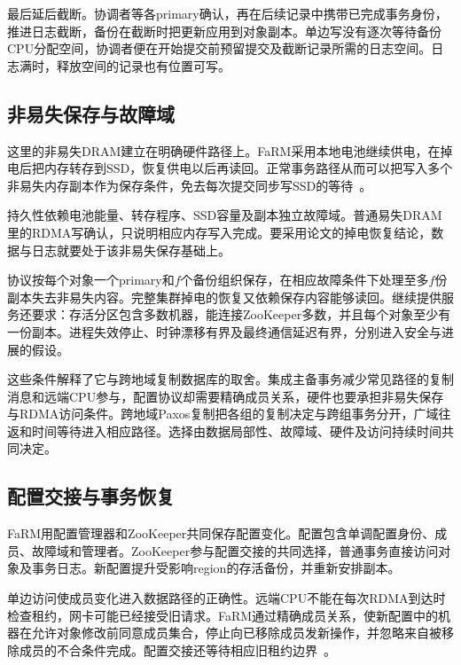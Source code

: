 最后延后截断。协调者等各primary确认，再在后续记录中携带已完成事务身份，推进日志截断，备份在截断时把更新应用到对象副本。单边写没有逐次等待备份CPU分配空间，协调者便在开始提交前预留提交及截断记录所需的日志空间。日志满时，释放空间的记录也有位置可写。

\subsection{非易失保存与故障域}

这里的非易失DRAM建立在明确硬件路径上。FaRM采用本地电池继续供电，在掉电后把内存转存到SSD，恢复供电以后再读回。正常事务路径从而可以把写入多个非易失内存副本作为保存条件，免去每次提交同步写SSD的等待~\cite{farm2015}。


持久性依赖电池能量、转存程序、SSD容量及副本独立故障域。普通易失DRAM里的RDMA写确认，只说明相应内存写入完成。要采用论文的掉电恢复结论，数据与日志就要处于该非易失保存基础上。

协议按每个对象一个primary和$f$个备份组织保存，在相应故障条件下处理至多$f$份副本失去非易失内容。完整集群掉电的恢复又依赖保存内容能够读回。继续提供服务还要求：存活分区包含多数机器，能连接ZooKeeper多数，并且每个对象至少有一份副本。进程失效停止、时钟漂移有界及最终通信延迟有界，分别进入安全与进展的假设。

这些条件解释了它与跨地域复制数据库的取舍。集成主备事务减少常见路径的复制消息和远端CPU参与，配置协议却需要精确成员关系，硬件也要承担非易失保存与RDMA访问条件。跨地域Paxos复制把各组的复制决定与跨组事务分开，广域往返和时间等待进入相应路径。选择由数据局部性、故障域、硬件及访问持续时间共同决定。

\subsection{配置交接与事务恢复}

FaRM用配置管理器和ZooKeeper共同保存配置变化。配置包含单调配置身份、成员、故障域和管理者。ZooKeeper参与配置交接的共同选择，普通事务直接访问对象及事务日志。新配置提升受影响region的存活备份，并重新安排副本。

单边访问使成员变化进入数据路径的正确性。远端CPU不能在每次RDMA到达时检查租约，网卡可能已经接受旧请求。FaRM通过精确成员关系，使新配置中的机器在允许对象修改前同意成员集合，停止向已移除成员发新操作，并忽略来自被移除成员的不合条件完成。配置交接还等待相应旧租约边界~\cite{farm2015}。

